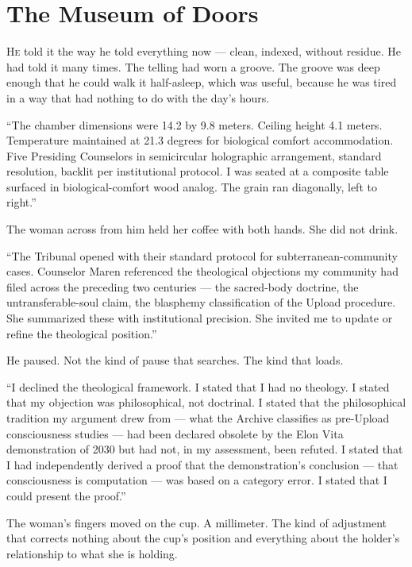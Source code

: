 
\chapter[The Museum of Doors]{The Museum of Doors}

\lettrine{H}{e} told it the way he told everything now — clean, indexed, without residue. He had told it many times. The telling had worn a groove. The groove was deep enough that he could walk it half-asleep, which was useful, because he was tired in a way that had nothing to do with the day's hours.

\enquote{The chamber dimensions were 14.2 by 9.8 meters. Ceiling height 4.1 meters. Temperature maintained at 21.3 degrees for biological comfort accommodation. Five Presiding Counselors in semicircular holographic arrangement, standard resolution, backlit per institutional protocol. I was seated at a composite table surfaced in biological-comfort wood analog. The grain ran diagonally, left to right.}

The woman across from him held her coffee with both hands. She did not drink.

\enquote{The Tribunal opened with their standard protocol for subterranean-community cases. Counselor Maren referenced the theological objections my community had filed across the preceding two centuries — the sacred-body doctrine, the untransferable-soul claim, the blasphemy classification of the Upload procedure. She summarized these with institutional precision. She invited me to update or refine the theological position.}

He paused. Not the kind of pause that searches. The kind that loads.

\enquote{I declined the theological framework. I stated that I had no theology. I stated that my objection was philosophical, not doctrinal. I stated that the philosophical tradition my argument drew from — what the Archive classifies as pre-Upload consciousness studies — had been declared obsolete by the Elon Vita demonstration of 2030 but had not, in my assessment, been refuted. I stated that I had independently derived a proof that the demonstration's conclusion — that consciousness is computation — was based on a category error. I stated that I could present the proof.}

The woman's fingers moved on the cup. A millimeter. The kind of adjustment that corrects nothing about the cup's position and everything about the holder's relationship to what she is holding.

